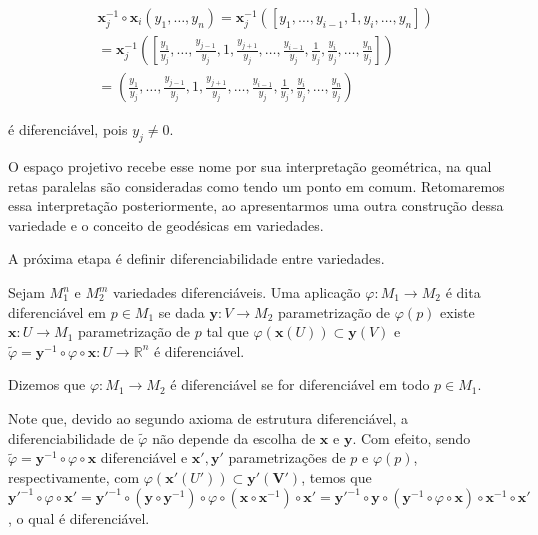 \begin{examples}
		\begin{align*}
			 & \mathbf{x}_{j}^{-1}\circ \mathbf{x}_{i}(y_{1}, \dots, y_{n})=\mathbf{x}_{j}^{-1}([y_{1}, \dots, y_{i-1}, 1, y_{i}, \dots, y_{n}])                                                                                             \\
			 & =\mathbf{x}_{j}^{-1}\left( \left[ \frac{y_{1}}{y_{j}}, \dots, \frac{y_{j-1}}{y_{j}}, 1, \frac{y_{j+1}}{y_{j}}, \dots, \frac{y_{i-1}}{y_{j}}, \frac{1}{y_{j}}, \frac{y_{i}}{y_{j}}, \dots, \frac{y_{n}}{y_{j}} \right] \right) \\
			 & = (\frac{y_{1}}{y_{j}}, \dots, \frac{y_{j-1}}{y_{j}}, 1, \frac{y_{j+1}}{y_{j}}, \dots, \frac{y_{i-1}}{y_{j}}, \frac{1}{y_{j}}, \frac{y_{i}}{y_{j}}, \dots, \frac{y_{n}}{y_{j}} )
		\end{align*}

		é diferenciável, pois $y_{j}\neq0$.
	\end{examples}
	O espaço projetivo recebe esse nome por sua interpretação geométrica, na qual retas paralelas são consideradas como tendo um ponto em comum. Retomaremos essa interpretação posteriormente, ao apresentarmos uma outra construção dessa variedade e o conceito de geodésicas em variedades.

	A próxima etapa é definir diferenciabilidade entre variedades.
	\begin{definition}
		\label{def:diferenciabilidade}
		Sejam $M_{1}^{n}$ e $M_{2}^{m}$ variedades diferenciáveis. Uma aplicação $\varphi:M_{1} \to M_{2}$ é dita diferenciável em $p \in M_{1}$ se dada $\mathbf{y}:V\to M_{2}$ parametrização de $\varphi(p)$ existe $\mathbf{x}:U\to M_{1}$ parametrização de $p$ tal que $\varphi(\mathbf{x}(U)) \subset \mathbf{y}(V)$ e $\tilde{\varphi}=\mathbf{y}^{-1}\circ\varphi \circ \mathbf{x}:U \to \mathbb{R}^{n}$ é diferenciável.

		Dizemos que $\varphi:M_{1}\to M_{2}$ é diferenciável se for diferenciável em todo $p \in M_{1}$.
	\end{definition}
	Note que, devido ao segundo axioma de estrutura diferenciável, a diferenciabilidade de $\tilde{\varphi}$ não depende da escolha de $\mathbf{x}$ e $\mathbf{y}$. Com efeito, sendo $\tilde{\varphi}=\mathbf{y}^{-1}\circ\varphi \circ \mathbf{x}$ diferenciável e $\mathbf{x}', \mathbf{y'}$ parametrizações de $p$ e $\varphi(p)$, respectivamente, com $\varphi(\mathbf{x'}(U')) \subset \mathbf{y'(V')}$, temos que $\mathbf{y'}^{-1} \circ \varphi \circ \mathbf{x'} = \mathbf{y'}^{-1} \circ (\mathbf{y} \circ\mathbf{y}^{-1})\circ\varphi \circ (\mathbf{x} \circ \mathbf{x}^{-1}) \circ \mathbf{x'} = \mathbf{y'}^{-1} \circ \mathbf{y} \circ (\mathbf{y}^{-1}\circ\varphi \circ \mathbf{x}) \circ \mathbf{x}^{-1} \circ \mathbf{x'}$, o qual é diferenciável.

